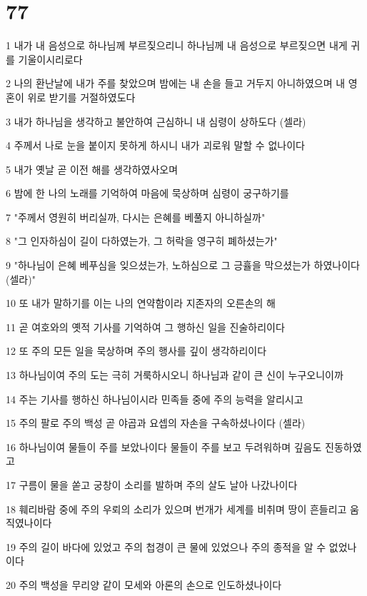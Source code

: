 \chapter{77}

\par 1 내가 내 음성으로 하나님께 부르짖으리니 하나님께 내 음성으로 부르짖으면 내게 귀를 기울이시리로다
\par 2 나의 환난날에 내가 주를 찾았으며 밤에는 내 손을 들고 거두지 아니하였으며 내 영혼이 위로 받기를 거절하였도다
\par 3 내가 하나님을 생각하고 불안하여 근심하니 내 심령이 상하도다 (셀라)
\par 4 주께서 나로 눈을 붙이지 못하게 하시니 내가 괴로워 말할 수 없나이다
\par 5 내가 옛날 곧 이전 해를 생각하였사오며
\par 6 밤에 한 나의 노래를 기억하여 마음에 묵상하며 심령이 궁구하기를
\par 7 "주께서 영원히 버리실까, 다시는 은혜를 베풀지 아니하실까"
\par 8 "그 인자하심이 길이 다하였는가, 그 허락을 영구히 폐하셨는가"
\par 9 "하나님이 은혜 베푸심을 잊으셨는가, 노하심으로 그 긍휼을 막으셨는가 하였나이다(셀라)"
\par 10 또 내가 말하기를 이는 나의 연약함이라 지존자의 오른손의 해
\par 11 곧 여호와의 옛적 기사를 기억하여 그 행하신 일을 진술하리이다
\par 12 또 주의 모든 일을 묵상하며 주의 행사를 깊이 생각하리이다
\par 13 하나님이여 주의 도는 극히 거룩하시오니 하나님과 같이 큰 신이 누구오니이까
\par 14 주는 기사를 행하신 하나님이시라 민족들 중에 주의 능력을 알리시고
\par 15 주의 팔로 주의 백성 곧 야곱과 요셉의 자손을 구속하셨나이다 (셀라)
\par 16 하나님이여 물들이 주를 보았나이다 물들이 주를 보고 두려워하며 깊음도 진동하였고
\par 17 구름이 물을 쏟고 궁창이 소리를 발하며 주의 살도 날아 나갔나이다
\par 18 훼리바람 중에 주의 우뢰의 소리가 있으며 번개가 세계를 비취며 땅이 흔들리고 움직였나이다
\par 19 주의 길이 바다에 있었고 주의 첩경이 큰 물에 있었으나 주의 종적을 알 수 없었나이다
\par 20 주의 백성을 무리양 같이 모세와 아론의 손으로 인도하셨나이다


